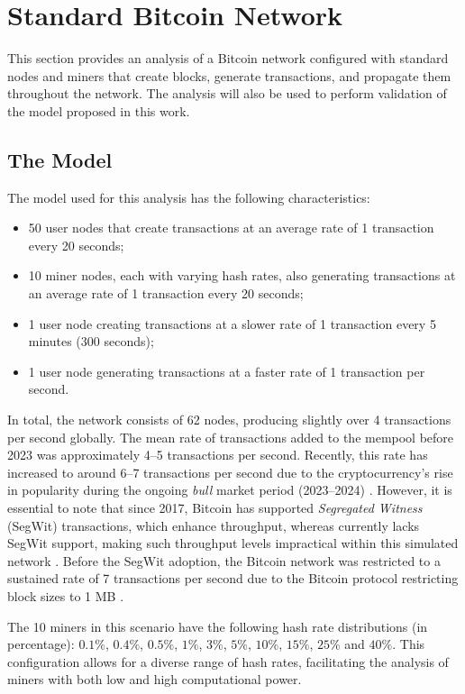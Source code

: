 \section{Standard Bitcoin Network}\label{sec:general-poc}

This section provides an analysis of a Bitcoin network configured with standard
nodes and miners that create blocks, generate transactions, and propagate them
throughout the network. The analysis will also be used to perform validation of
the model proposed in this work.

\subsection{The Model}\label{subsec:general-model}

The model used for this analysis has the following characteristics:
\begin{itemize}
	\item 50 user nodes that create transactions at an average rate of 1
		transaction every 20 seconds;
	\item 10 miner nodes, each with varying hash rates, also generating
		transactions at an average rate of 1 transaction every 20
		seconds;
	\item 1 user node creating transactions at a slower rate of 1
		transaction every 5 minutes (300 seconds);
	\item 1 user node generating transactions at a faster rate of 1
		transaction per second.
\end{itemize}

In total, the network consists of 62 nodes, producing slightly over 4
transactions per second globally. The mean rate of transactions added to the
mempool before 2023 was approximately 4--5 transactions per second. Recently,
this rate has increased to around 6--7 transactions per second due to the
cryptocurrency's rise in popularity during the ongoing \emph{bull} market
period (2023--2024) \cite{blockchaincom-tps}. However, it is essential to note
that since 2017, Bitcoin has supported \emph{Segregated Witness} (SegWit)
transactions, which enhance throughput, whereas \iblock{} currently lacks
SegWit support, making such throughput levels impractical within this simulated
network \cites{bip141, bip144}. Before the SegWit adoption, the Bitcoin network
was restricted to a sustained rate of 7 transactions per second due to the
Bitcoin protocol restricting block sizes to 1 MB \cite{btcwiki-scalability}. 


The 10 miners in this scenario have the following hash rate distributions (in
percentage): \(0.1\%\), \(0.4\%\), \(0.5\%\), \(1\%\), \(3\%\), \(5\%\),
\(10\%\), \(15\%\), \(25\%\) and \(40\%\). This configuration allows for a
diverse range of hash rates, facilitating the analysis of miners with both low
and high computational power.

